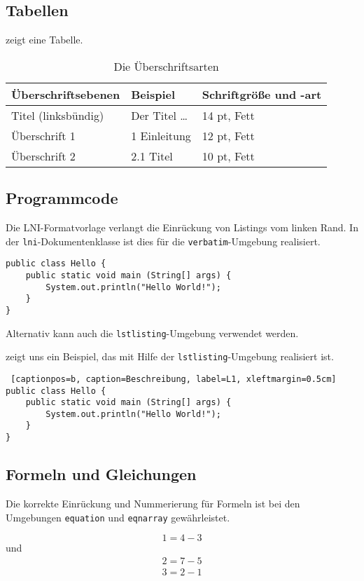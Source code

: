 \documentclass[english,utf8]{lni}
\begin{document}
\subsection{Tabellen}
 zeigt eine Tabelle.

\begin{table}
\centering
\begin{tabular}{lll}
\toprule
Überschriftsebenen & Beispiel & Schriftgröße und -art \\
\midrule
Titel (linksbündig) & Der Titel \ldots & 14 pt, Fett\\
Überschrift 1 & 1 Einleitung & 12 pt, Fett\\
Überschrift 2 & 2.1 Titel & 10 pt, Fett\\
\bottomrule
\end{tabular}
\caption{Die Überschriftsarten}
\label{tab:demo}
\end{table}

\subsection{Programmcode}
Die LNI-Formatvorlage verlangt die Einrückung von Listings vom linken Rand.
In der \texttt{lni}-Dokumentenklasse ist dies für die \texttt{verbatim}-Umgebung realisiert.

\begin{verbatim}
public class Hello { 
    public static void main (String[] args) { 
        System.out.println("Hello World!"); 
    } 
} 
\end{verbatim}

Alternativ kann auch die \texttt{lstlisting}-Umgebung verwendet werden.

 zeigt uns ein Beispiel, das mit Hilfe der \texttt{lstlisting}-Umgebung realisiert ist.

\lstset{basicstyle=\ttfamily}
\begin{lstlisting} [captionpos=b, caption=Beschreibung, label=L1, xleftmargin=0.5cm]
public class Hello { 
    public static void main (String[] args) { 
        System.out.println("Hello World!"); 
    } 
}
\end{lstlisting}

\subsection{Formeln und Gleichungen}

Die korrekte Einrückung und Nummerierung für Formeln ist bei den Umgebungen \texttt{equation} und \texttt{eqnarray} gewährleistet.

\begin{equation}
  1=4-3
\end{equation}
und
\begin{eqnarray}
  2=7-5\\
  3=2-1
\end{eqnarray}

%


\end{document}
